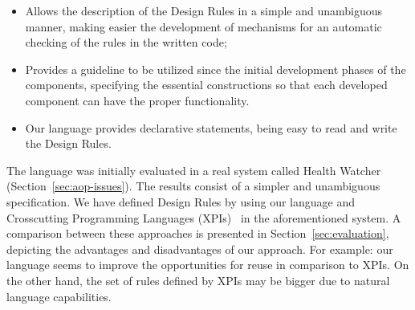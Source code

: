 \begin{itemize}

    \item Allows the description of the Design Rules in a simple and unambiguous manner,
    making easier the development of mechanisms for an automatic
    checking of the rules in the written code;

    \item Provides a guideline to be utilized since the initial development phases
    of the components, specifying the essential constructions so that each developed
    component can have the proper functionality.

    \item Our language provides declarative statements, being easy to read and write
    the Design Rules.

\end{itemize}

The language was initially evaluated in a real system called Health
Watcher~\cite{} (Section~\ref{sec:aop-issues}). The results consist
of a simpler and unambiguous specification. We have defined Design
Rules by using our language and Crosscutting Programming Languages
(XPIs)~\cite{sullivan-ieee-sw-2006} in the aforementioned system.
A comparison between these approaches is presented in
Section~\ref{sec:evaluation}, depicting the advantages and
disadvantages of our approach. For example: our language seems to
improve the opportunities for reuse in comparison to XPIs. On the
other hand, the set of rules defined by XPIs may be bigger due to
natural language capabilities.
